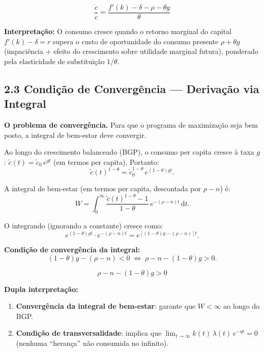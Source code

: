 \documentclass[12pt, a4paper]{article}
\newcommand{\dif}{\mathrm{d}}
\begin{document}
\begin{formulabox}[title={Regra de Keynes-Ramsey (por unidade efetiva de trabalho)}]
\[
\boxed{\frac{\dot{c}}{c} = \frac{f'(k) - \delta - \rho - \theta g}{\theta}}
\]
\end{formulabox}

\textbf{Interpretação:} O consumo cresce quando o retorno marginal do capital $f'(k)-\delta = r$ supera o custo de oportunidade do consumo presente $\rho + \theta g$ (impaciência + efeito do crescimento sobre utilidade marginal futura), ponderado pela elasticidade de substituição $1/\theta$.

\subsection*{2.3 Condição de Convergência --- Derivação via Integral}

\textbf{O problema de convergência.} Para que o programa de maximização seja bem posto, a integral de bem-estar deve convergir.

Ao longo do crescimento balanceado (BGP), o consumo per capita cresce à taxa $g$: $\tilde{c}(t) = \tilde{c}_0\, e^{gt}$ (em termos per capita). Portanto:
\[
\tilde{c}(t)^{1-\theta} = \tilde{c}_0^{1-\theta}\,e^{(1-\theta)gt}.
\]

A integral de bem-estar (em termos per capita, descontada por $\rho-n$) é:
\[
W = \int_0^\infty \frac{\tilde{c}(t)^{1-\theta}-1}{1-\theta}\,e^{-(\rho-n)t}\,\dif t.
\]

O integrando (ignorando a constante) cresce como:
\[
e^{(1-\theta)gt}\cdot e^{-(\rho-n)t} = e^{\left[(1-\theta)g - (\rho-n)\right]t}.
\]

\textbf{Condição de convergência da integral:}
\[
(1-\theta)g - (\rho - n) < 0 \;\Longleftrightarrow\; \rho - n - (1-\theta)g > 0.
\]

\begin{formulabox}[title={Condição de Convergência / Transversalidade (RCK)}]
\[
\boxed{\rho - n - (1-\theta)g > 0}
\]
\end{formulabox}

\textbf{Dupla interpretação:}
\begin{enumerate}[leftmargin=*]
\item \textbf{Convergência da integral de bem-estar}: garante que $W < \infty$ ao longo do BGP.
\item \textbf{Condição de transversalidade}: implica que $\lim_{t\to\infty} k(t)\,\lambda(t)\,e^{-\eta t} = 0$ (nenhuma ``herança'' não consumida no infinito).
\end{enumerate}
\end{document}
